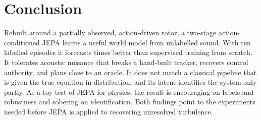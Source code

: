 \documentclass[10pt,journal]{IEEEtran}
\begin{document}
\section{Conclusion}
Rebuilt around a partially observed, action-driven rotor, a two-stage action-conditioned JEPA learns a useful world model from unlabelled sound. With ten labelled episodes it forecasts \nLabelRatioTen{} times better than supervised training from scratch. It tolerates acoustic nuisance that breaks a hand-built tracker, recovers control authority, and plans close to an oracle. It does not match a classical pipeline that is given the true equation in distribution, and its latent identifies the system only partly. As a toy test of JEPA for physics, the result is encouraging on labels and robustness and sobering on identification. Both findings point to the experiments needed before JEPA is applied to recovering unresolved turbulence.



\end{document}
